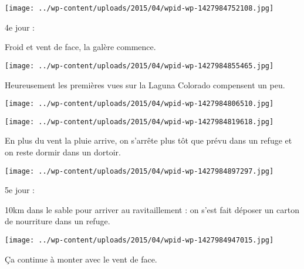 \begin{center} \texttt{[image: ../wp-content/uploads/2015/04/wpid-wp-1427984752108.jpg]} \end{center}



 4e jour : 

 Froid et vent de face, la galère commence.

 

\begin{center} \texttt{[image: ../wp-content/uploads/2015/04/wpid-wp-1427984855465.jpg]} \end{center}



 Heureusement les premières vues sur la Laguna Colorado compensent un peu.

 

\begin{center} \texttt{[image: ../wp-content/uploads/2015/04/wpid-wp-1427984806510.jpg]} \end{center}



 

\begin{center} \texttt{[image: ../wp-content/uploads/2015/04/wpid-wp-1427984819618.jpg]} \end{center}



 En plus du vent la pluie arrive, on s'arrête plus tôt que prévu dans un refuge et on reste dormir dans un dortoir.

 

\begin{center} \texttt{[image: ../wp-content/uploads/2015/04/wpid-wp-1427984897297.jpg]} \end{center}



 5e jour : 

 10km dans le sable pour arriver au ravitaillement : on s'est fait déposer un carton de nourriture dans un refuge.

 

\begin{center} \texttt{[image: ../wp-content/uploads/2015/04/wpid-wp-1427984947015.jpg]} \end{center}



 Ça continue à monter avec le vent de face.

